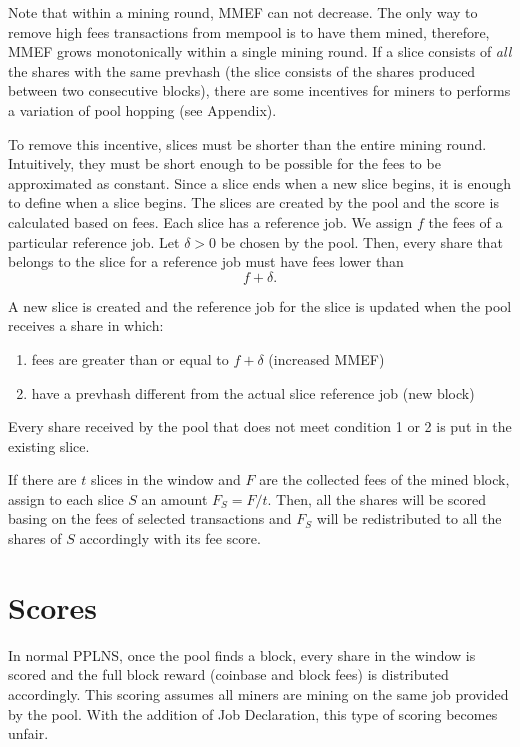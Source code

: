 \documentclass[11pt]{article}
\begin{document}
Note that within a mining round, MMEF can not decrease. The only way to remove high fees transactions from mempool is to have them mined, therefore, MMEF grows monotonically within a single mining round. If a slice consists of \emph{all} the shares with the same prevhash (the slice consists of the shares produced between two consecutive blocks), there are some incentives for miners to performs a variation of pool hopping (see Appendix).

To remove this incentive, slices must be shorter than the entire mining round. Intuitively, they must be short enough to be possible for the fees to be approximated as constant. Since a slice ends when a new slice begins, it is enough to define when a slice begins. The slices are created by the pool and the score is calculated based on fees. Each slice has a reference job. We assign $f$ the fees of a particular reference job. Let $\delta>0$ be chosen by the pool. Then, every share that belongs to the slice for a reference job must have fees lower than \[ f+\delta.\]

A new slice is created and the reference job for the slice is updated when the pool receives a share in which:
\begin{enumerate}
	\item fees are greater than or equal to $f+\delta$ (increased MMEF)
	\item have a prevhash different from the actual slice reference job (new block)
\end{enumerate}
Every share received by the pool that does not meet condition 1 or 2 is put in the existing slice. 

If there are $t$ slices in the window and $F$ are the collected fees of the mined block, assign to each slice $S$ an amount $F_S = F/t$. Then, all the shares will be scored basing on the fees of selected transactions and $F_S$ will be redistributed to all the shares of $S$ accordingly with its fee score.

\section{Scores}
In normal PPLNS, once the pool finds a block, every share in the window is scored and the full block reward (coinbase and block fees) is distributed accordingly. This scoring assumes all miners are mining on the same job provided by the pool. With the addition of Job Declaration, this type of scoring becomes unfair. 
\end{document}
